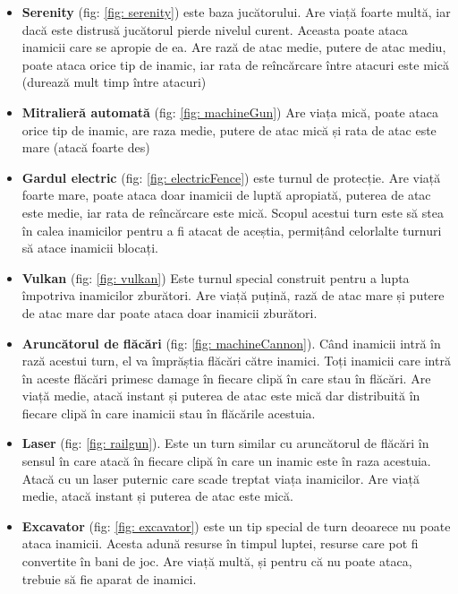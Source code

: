 \documentclass[12pt, a4paper]{article}
\begin{document}
	\begin{itemize}
		\item \textbf{Serenity} (fig: \ref{fig: serenity}) este baza jucătorului. Are viață foarte multă, iar dacă este distrusă jucătorul pierde nivelul curent. Aceasta poate ataca inamicii care se apropie de ea. Are rază de atac medie, putere de atac mediu, poate ataca orice tip de inamic, iar rata de reîncărcare între atacuri este mică (durează mult timp între atacuri)
		\item \textbf{Mitralieră automată} (fig: \ref{fig: machineGun}) Are viața mică, poate ataca orice tip de inamic, are raza medie, putere de atac mică și rata de atac este mare (atacă foarte des)
		\item \textbf{Gardul electric} (fig: \ref{fig: electricFence}) este turnul de protecție. Are viață foarte mare, poate ataca doar inamicii de luptă apropiată, puterea de atac este medie, iar rata de reîncărcare este mică. Scopul acestui turn este să stea în calea inamicilor pentru a fi atacat de aceștia, permițând celorlalte turnuri să atace inamicii blocați.
		\item \textbf{Vulkan} (fig: \ref{fig: vulkan}) Este turnul special construit pentru a lupta împotriva inamicilor zburători. Are viață puțină, rază de atac mare și putere de atac mare dar poate ataca doar inamicii zburători.
		\item \textbf{Aruncătorul de flăcări} (fig: \ref{fig: machineCannon}). Când inamicii intră în rază acestui turn, el va împrăștia flăcări către inamici. Toți inamicii care intră în aceste flăcări primesc damage în fiecare clipă în care stau în flăcări. Are viață medie, atacă instant și puterea de atac este mică dar distribuită în fiecare clipă în care inamicii stau în flăcările acestuia.
		\item \textbf{Laser} (fig: \ref{fig: railgun}). Este un turn similar cu aruncătorul de flăcări în sensul în care atacă în fiecare clipă în care un inamic este în raza acestuia. Atacă cu un laser puternic care scade treptat viața inamicilor. Are viață medie, atacă instant și puterea de atac este mică.
		\item \textbf{Excavator} (fig: \ref{fig: excavator}) este un tip special de turn deoarece nu poate ataca inamicii. Acesta adună resurse în timpul luptei, resurse care pot fi convertite în bani de joc. Are viață multă, și pentru că nu poate ataca, trebuie să fie aparat de inamici.
	\end{itemize}
	
\end{document}
